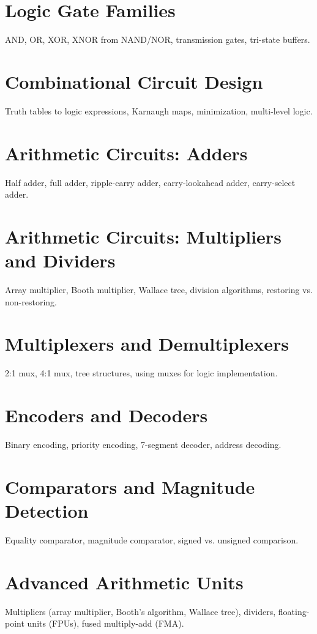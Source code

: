 \chapter{Logic Gate Families}
AND, OR, XOR, XNOR from NAND/NOR, transmission gates, tri-state buffers.

\chapter{Combinational Circuit Design}
Truth tables to logic expressions, Karnaugh maps, minimization, multi-level logic.


\chapter{Arithmetic Circuits: Adders}
Half adder, full adder, ripple-carry adder, carry-lookahead adder, carry-select adder.

\chapter{Arithmetic Circuits: Multipliers and Dividers}
Array multiplier, Booth multiplier, Wallace tree, division algorithms, restoring vs. non-restoring.

\chapter{Multiplexers and Demultiplexers}
2:1 mux, 4:1 mux, tree structures, using muxes for logic implementation.

\chapter{Encoders and Decoders}
Binary encoding, priority encoding, 7-segment decoder, address decoding.

\chapter{Comparators and Magnitude Detection}
Equality comparator, magnitude comparator, signed vs. unsigned comparison.

\chapter{Advanced Arithmetic Units}
Multipliers (array multiplier, Booth's algorithm, Wallace tree), dividers, floating-point units (FPUs), fused multiply-add (FMA).

